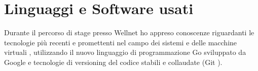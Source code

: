 \chapter{Linguaggi e Software usati}
Durante il percorso di stage presso Wellnet ho appreso conoscenze riguardanti
le tecnologie più recenti e promettenti nel campo dei sistemi e delle
macchine virtuali , utilizzando il nuovo linguaggio di programmazione
Go  sviluppato da Google e tecnologie di versioning del codice stabili
e collaudate (Git \cite{git-website}).
